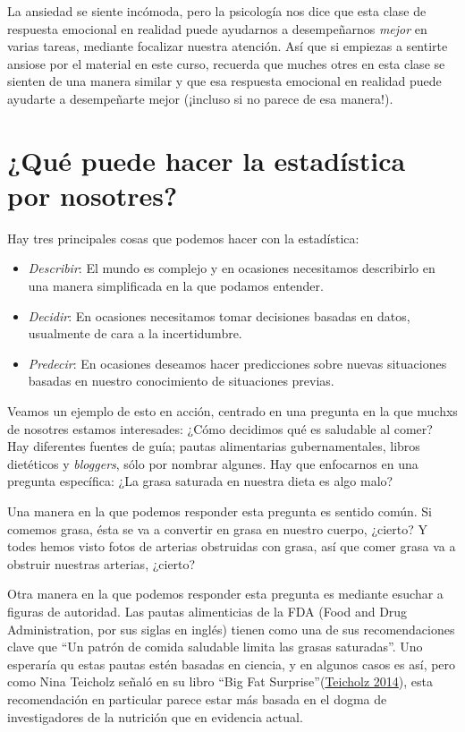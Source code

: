 \documentclass[
  12pt,
]{book}
\providecommand{\tightlist}{%
  \setlength{\itemsep}{0pt}\setlength{\parskip}{0pt}}
\begin{document}
La ansiedad se siente incómoda, pero la psicología nos dice que esta clase de respuesta emocional en realidad puede ayudarnos a desempeñarnos \emph{mejor} en varias tareas, mediante focalizar nuestra atención. Así que si empiezas a sentirte ansiose por el material en este curso, recuerda que muches otres en esta clase se sienten de una manera similar y que esa respuesta emocional en realidad puede ayudarte a desempeñarte mejor (¡incluso si no parece de esa manera!).

\hypertarget{quuxe9-puede-hacer-la-estaduxedstica-por-nosotres}{%
\section{¿Qué puede hacer la estadística por nosotres?}\label{quuxe9-puede-hacer-la-estaduxedstica-por-nosotres}}

Hay tres principales cosas que podemos hacer con la estadística:

\begin{itemize}
\tightlist
\item
  \emph{Describir}: El mundo es complejo y en ocasiones necesitamos describirlo en una manera simplificada en la que podamos entender.
\item
  \emph{Decidir}: En ocasiones necesitamos tomar decisiones basadas en datos, usualmente de cara a la incertidumbre.
\item
  \emph{Predecir}: En ocasiones deseamos hacer predicciones sobre nuevas situaciones basadas en nuestro conocimiento de situaciones previas.
\end{itemize}

Veamos un ejemplo de esto en acción, centrado en una pregunta en la que muchxs de nosotres estamos interesades: ¿Cómo decidimos qué es saludable al comer?
Hay diferentes fuentes de guía; pautas alimentarias gubernamentales, libros dietéticos y \emph{bloggers}, sólo por nombrar algunes.
Hay que enfocarnos en una pregunta específica: ¿La grasa saturada en nuestra dieta es algo malo?

Una manera en la que podemos responder esta pregunta es sentido común.
Si comemos grasa, ésta se va a convertir en grasa en nuestro cuerpo, ¿cierto?
Y todes hemos visto fotos de arterias obstruidas con grasa, así que comer grasa va a obstruir nuestras arterias, ¿cierto?

Otra manera en la que podemos responder esta pregunta es mediante esuchar a figuras de autoridad. Las pautas alimenticias de la FDA (Food and Drug Administration, por sus siglas en inglés) tienen como una de sus recomendaciones clave que ``Un patrón de comida saludable limita las grasas saturadas''. Uno esperaría qu estas pautas estén basadas en ciencia, y en algunos casos es así, pero como Nina Teicholz señaló en su libro ``Big Fat Surprise''(\protect\hyperlink{ref-teic:2014}{Teicholz 2014}), esta recomendación en particular parece estar más basada en el dogma de investigadores de la nutrición que en evidencia actual.
\end{document}
